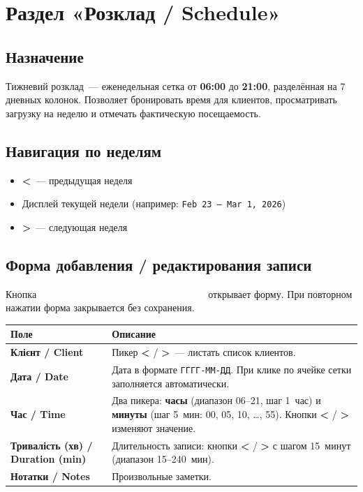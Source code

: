 \documentclass[12pt,a4paper]{article}
\newcommand{\btn}[2][primary]{%
  \textcolor{white}{\colorbox{#1}{\small\bfseries\,#2\,}}%
}
\begin{document}
\section{Раздел «Розклад / Schedule»}

\subsection{Назначение}

Тижневий розклад~--- еженедельная сетка от \textbf{06:00}
до \textbf{21:00}, разделённая на 7 дневных колонок.
Позволяет бронировать время для клиентов, просматривать загрузку
на неделю и отмечать фактическую посещаемость.

\subsection{Навигация по неделям}

\begin{itemize}
  \item \textbf{<}~--- предыдущая неделя
  \item Дисплей текущей недели (например: \texttt{Feb 23 – Mar 1, 2026})
  \item \textbf{>}~--- следующая неделя
\end{itemize}

\subsection{Форма добавления / редактирования записи}

Кнопка \btn{Додати запис / Add Appointment} открывает форму.
При повторном нажатии форма закрывается без сохранения.

\bigskip
\begin{center}
\begin{tabularx}{0.9\textwidth}{>{\bfseries}lX}
  \toprule
  Поле & Описание \\
  \midrule
  Клієнт / Client &
    Пикер \textbf{<} / \textbf{>}~--- листать список клиентов. \\
  Дата / Date &
    Дата в формате \texttt{ГГГГ-ММ-ДД}. При клике по ячейке сетки
    заполняется автоматически. \\
  Час / Time &
    Два пикера: \textbf{часы} (диапазон 06--21, шаг 1~час) и
    \textbf{минуты} (шаг 5~мин: 00, 05, 10, \ldots, 55).
    Кнопки \textbf{<} / \textbf{>} изменяют значение. \\
  Тривалість (хв) / Duration (min) &
    Длительность записи: кнопки \textbf{<} / \textbf{>} с шагом
    15~минут (диапазон 15--240~мин). \\
  Нотатки / Notes &
    Произвольные заметки. \\
  \bottomrule
\end{tabularx}
\end{center}
\end{document}
